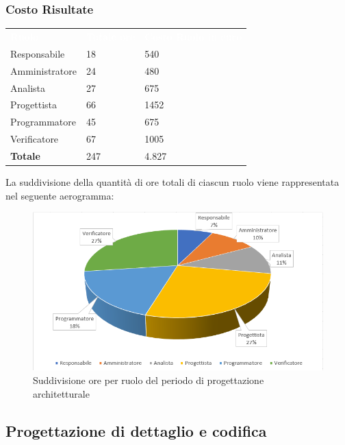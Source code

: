 \subsubsection{Costo Risultate}
{
	\renewcommand{\arraystretch}{2}
	\centering
	\begin{longtable}{ C{3cm} C{2cm} C{4cm}}
		\textcolor{white}{\textbf{Ruolo}} & \textcolor{white}{\textbf{Totale ore}} & \textcolor{white}{\textbf{Costo Ruolo in euro}}\\	
        
        Responsabile & 18 & 540 \\
        Amministratore & 24 & 480 \\
        Analista & 27 & 675 \\
        Progettista & 66 & 1452 \\
        Programmatore & 45 & 675 \\
        Verificatore & 67 & 1005 \\
        \textbf{Totale} & 247 & 4.827 \\
		
	\end{longtable}
}

La suddivisione della quantità di ore totali di ciascun ruolo viene rappresentata nel seguente aerogramma:

\begin{figure}[h]
	\centering
	\includegraphics[scale=2.5]{sezioni/Aerogrammi/AerogrammaProgettArchitetturale.png}
	\caption{Suddivisione ore per ruolo del periodo di progettazione architetturale}
\end{figure}

\subsection{Progettazione di dettaglio e codifica}

